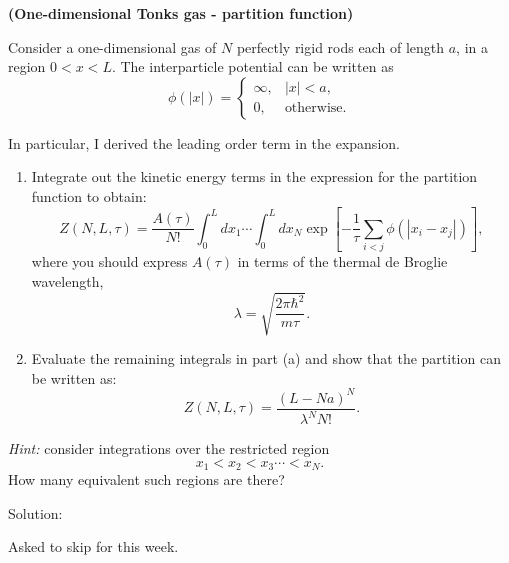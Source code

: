 \newpage
\begin{homeworkProblem}
    \textbf{(One-dimensional Tonks gas - partition function)}

    Consider a one-dimensional gas of $N$ perfectly rigid rods each of length $a$, in a region $0<x<L$. The interparticle potential can be written as
    \[
        \phi(|x|)=
        \begin{cases}
            \infty, & |x|<a,\\
            0, & \text{otherwise}.
        \end{cases}
    \]

    In particular, I derived the leading order term in the expansion.

    \begin{enumerate}
        \item[(a)] Integrate out the kinetic energy terms in the expression for the partition function to obtain:
            \[
                Z(N,L,\tau)
                =
                \frac{A(\tau)}{N!}
                \int_0^L dx_1 \cdots
                \int_0^L dx_N
                \exp\left[
                    -\frac{1}{\tau}
                    \sum_{i<j}\phi(|x_i-x_j|)
                \right],
            \]
            where you should express $A(\tau)$ in terms of the thermal de Broglie wavelength,
            \[
                \lambda=\sqrt{\frac{2\pi\hbar^2}{m\tau}}.
            \]

        \item[(b)] Evaluate the remaining integrals in part (a) and show that the partition can be written as:
            \[
                Z(N,L,\tau)
                =
                \frac{(L-Na)^N}{\lambda^N N!}.
            \]
    \end{enumerate}

    \textit{Hint:} consider integrations over the restricted region
    \[
        x_1<x_2<x_3\cdots<x_N.
    \]
    How many equivalent such regions are there?
    \begin{callout}{Solution:}

    Asked to skip for this week.

    \end{callout}
\end{homeworkProblem}

